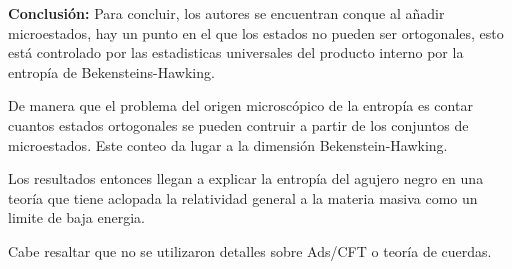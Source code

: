 \documentclass[letterpaper]{article}
\begin{document}
\newpage
\begin{justify}
\textbf{Conclusión:}
Para concluir, los autores se encuentran conque al añadir microestados, hay un punto en el que los estados no pueden ser ortogonales, esto está controlado por las estadisticas universales del producto interno
por la entropía de Bekensteins-Hawking.
\end{justify}
\begin{justify}
De manera que el problema del origen microscópico de la entropía es contar cuantos estados ortogonales se pueden contruir a partir de los conjuntos de microestados. Este conteo da lugar a la dimensión Bekenstein-Hawking.
\end{justify}
\begin{justify}
Los resultados entonces llegan a explicar la entropía del agujero negro en una teoría que tiene aclopada la relatividad general a la materia masiva como un limite de baja energia.
\end{justify}
\begin{justify}
Cabe resaltar que no se utilizaron detalles sobre Ads/CFT o teoría de cuerdas.
\end{justify}

\vspace{\baselineskip}
\end{document}
